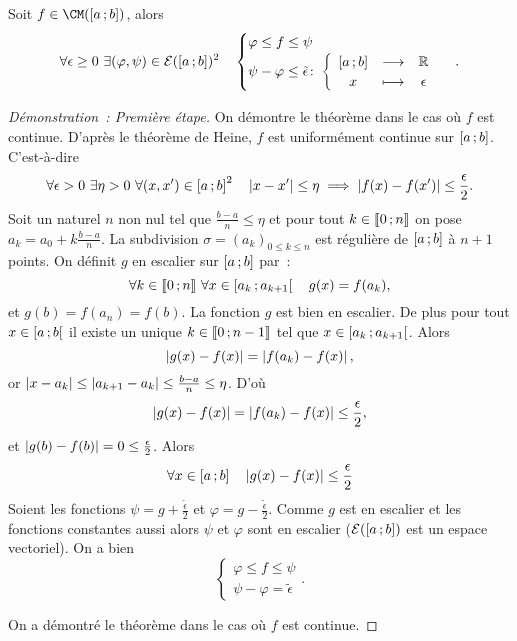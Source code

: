 \begin{theo}
  Soit $f \in \CM(\intervalleff{a}{b})$, alors
  \begin{equation}
    \forall \epsilon \geq 0 \ \exists (\varphi, \psi) \in \mathcal{E}(\left[ a \, ;  b \right])^2 \quad \begin{cases} \varphi \leq f \leq \psi \\ \psi-\varphi \leq \tilde{\epsilon}\colon \left\{\begin{array}{ccc} \left[ a \, ;  b \right] & \longrightarrow &\mathbb{R}\\ x & \longmapsto & \epsilon \end{array} \right. \end{cases}.
  \end{equation}
\end{theo}
\begin{proof}[Démonstration~: Première étape]
  On démontre le théorème dans le cas où $f$ est continue. D'après le théorème de Heine, $f$ est uniformément continue sur $\left[ a \, ;  b \right]$. C'est-à-dire
  \begin{equation}
    \forall \epsilon >0 \ \exists \eta>0 \ \forall (x,x') \in \intervalleff{a}{b}^2 \quad \abs{x-x'} \leq \eta \implies \abs{f(x)-f(x')} \leq \frac{\epsilon}{2}.
  \end{equation}
  Soit un naturel $n$ non nul tel que $\frac{b-a}{n} \leq \eta$ et pour tout $k \in \mathopen{\llbracket}0\mathclose{}\mathpunct{};n\mathclose{\rrbracket}$ on pose $a_k=a_0+k \frac{b-a}{n}$. La subdivision $\sigma=(a_k)_{0 \leq k \leq n}$ est régulière de $\left[ a \, ;  b \right]$ à $n+1$ points. On définit $g$ en escalier sur $\left[ a \, ;  b \right]$ par~:
  \begin{equation}
    \forall k \in \mathopen{\llbracket}0\mathclose{}\mathpunct{};n\mathclose{\rrbracket} \ \forall x \in \left[ a_k \, ;  a_{k+1} \right[ \quad g(x)=f(a_k),
  \end{equation}
  et $g(b)=f(a_n)=f(b)$. La fonction $g$ est bien en escalier. De plus pour tout $x \in \left[ a \, ;  b \right[$ il existe un unique $k \in \mathopen{\llbracket}0\mathclose{}\mathpunct{};n-1\mathclose{\rrbracket}$ tel que $x \in \left[ a_k \, ;  a_{k+1} \right[$.  Alors
  \begin{equation}
    \left\lvert g(x)-f(x)\right\rvert = \left\lvert f(a_k)-f(x)\right\rvert,
  \end{equation}
  or $\left\lvert x-a_k\right\rvert \leq \left\lvert a_{k+1}-a_k\right\rvert \leq \frac{b-a}{n}\leq \eta$. D'où
  \begin{equation}
    \left\lvert g(x)-f(x)\right\rvert = \left\lvert f(a_k)-f(x)\right\rvert \leq \frac{\epsilon}{2},
  \end{equation}
  et $\left\lvert g(b)-f(b)\right\rvert=0 \leq \frac{\epsilon}{2}$. Alors
  \begin{equation}
    \forall x \in \left[ a \, ;  b \right] \quad \left\lvert g(x)-f(x)\right\rvert \leq \frac{\epsilon}{2}
  \end{equation}
  Soient les fonctions $\psi=g + \frac{\tilde{\epsilon}}{2}$ et $\varphi=g - \frac{\tilde{\epsilon}}{2}$. Comme $g$ est en escalier et les fonctions constantes aussi alors $\psi$ et $\varphi$ sont en escalier ($\mathcal{E}(\left[ a \, ;  b \right])$ est un espace vectoriel). On a bien
  \begin{equation}
    \begin{cases}
      \varphi \leq f \leq \psi \\
      \psi-\varphi=\tilde{\epsilon}
    \end{cases}.
  \end{equation}

  On a démontré le théorème dans le cas où $f$ est continue.
\end{proof}
